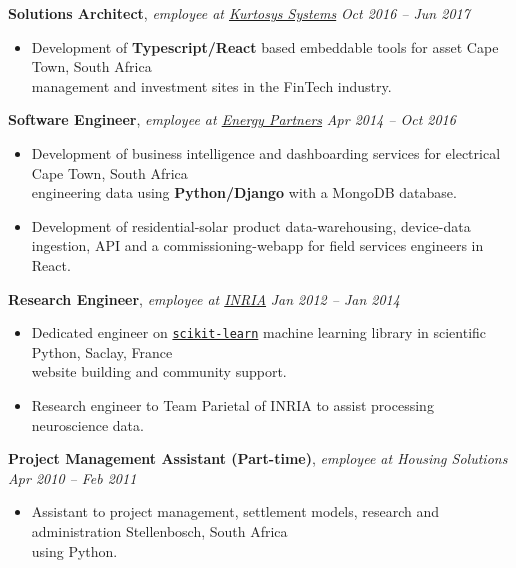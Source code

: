 \documentclass[9pt]{extarticle}
\begin{document}
\noindent
{\bf Solutions Architect}, \textit{employee at \href{https://www.kurtosys.com/}{Kurtosys Systems}}  \hfill \textit{Oct 2016 -- Jun 2017}
\begin{itemize}
\setlength\itemsep{0.05em}
\item Development of \textbf{Typescript/React} based embeddable tools for asset \hfill Cape Town, South Africa \\
management and investment sites in the FinTech industry.
\end{itemize}

\noindent
{\bf Software Engineer}, \textit{employee at \href{https://energypartners.co.za/}{Energy Partners}}  \hfill \textit{Apr 2014 -- Oct 2016}
\begin{itemize}
\setlength\itemsep{0.05em}
\item Development of business intelligence and dashboarding services for electrical \hfill Cape Town, South Africa \\
engineering data using \textbf{Python/Django} with a MongoDB database.
\item Development of residential-solar product data-warehousing, device-data \\
ingestion, API and a commissioning-webapp for field services engineers in React.

\end{itemize}

\noindent
{\bf Research Engineer}, \textit{employee at \href{https://www.inria.fr/en}{INRIA}}  \hfill \textit{Jan 2012 -- Jan 2014}
\begin{itemize}
\setlength\itemsep{0.05em}

\item Dedicated engineer on \href{https://scikit-learn.org/stable/}{\texttt{scikit-learn}} machine learning library in scientific Python, \hfill Saclay, France \\
website building and community support.
\item Research engineer to Team Parietal of INRIA to assist processing neuroscience data.

\end{itemize}

\noindent
{\bf Project Management Assistant (Part-time)}, \textit{employee at Housing Solutions}  \hfill \textit{Apr 2010 -- Feb 2011}
\begin{itemize}
\setlength\itemsep{0.05em}
\item Assistant to project management, settlement models, research and administration \hfill Stellenbosch, South Africa \\
using Python.

\end{itemize}
\end{document}
